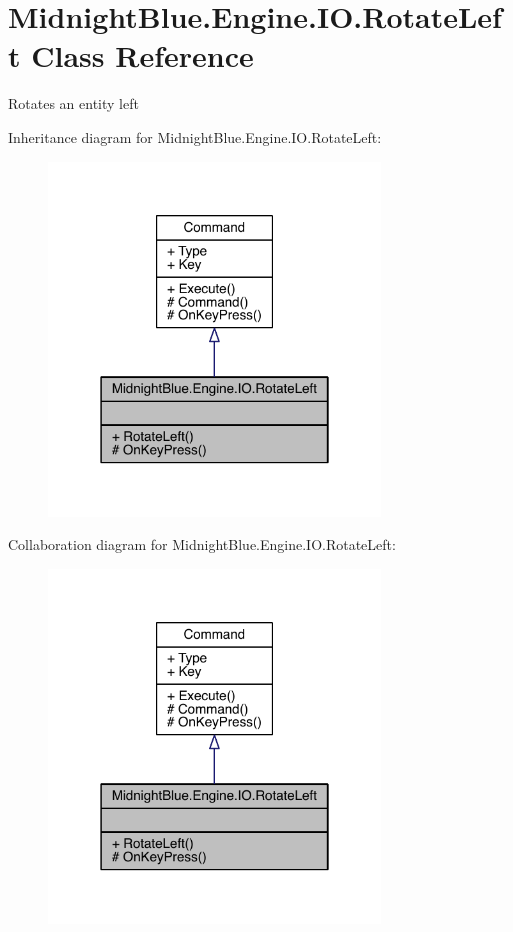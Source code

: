 \hypertarget{class_midnight_blue_1_1_engine_1_1_i_o_1_1_rotate_left}{}\section{Midnight\+Blue.\+Engine.\+I\+O.\+Rotate\+Left Class Reference}
\label{class_midnight_blue_1_1_engine_1_1_i_o_1_1_rotate_left}


Rotates an entity left  




Inheritance diagram for Midnight\+Blue.\+Engine.\+I\+O.\+Rotate\+Left\+:
\nopagebreak
\begin{figure}[H]
\begin{center}
\leavevmode
\includegraphics[width=250pt]{class_midnight_blue_1_1_engine_1_1_i_o_1_1_rotate_left__inherit__graph}
\end{center}
\end{figure}


Collaboration diagram for Midnight\+Blue.\+Engine.\+I\+O.\+Rotate\+Left\+:
\nopagebreak
\begin{figure}[H]
\begin{center}
\leavevmode
\includegraphics[width=250pt]{class_midnight_blue_1_1_engine_1_1_i_o_1_1_rotate_left__coll__graph}
\end{center}
\end{figure}
